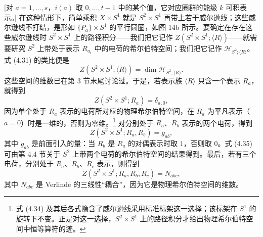 \documentclass[11pt,a4paper]{article}
\begin{document}
[对 $a=1,\dots,s$，$i(a)$ 取 $0,\dots,t-1$ 中的某个值，它对应圈群的能级 $k$ 可积表示。] 在这种情形下，简单乘积 $X\times S^1$ 就是 $S^2\times S^1$ 再带上若干威尔逊线；这些威尔逊线不打结，是形如 $\{P_a\}\times S^1$ 的平行圆圈，如图 14b 所示。要确定在存在这些威尔逊线时 $S^2\times S^1$ 上的路径积分——我们把它记作 $Z(S^2\times S^1;\langle R\rangle)$——就需要研究 $S^2$ 上带处于表示 $R_{a_i}$ 中的电荷的希尔伯特空间；我们把它记作 $\mathcal{H}_{S^2;\langle R\rangle}$。式 (4.31) 的类比便是
\begin{equation}
    Z(S^2\times S^1;\langle R\rangle) = \dim \mathcal{H}_{S^2;\langle R\rangle}. \tag{4.33}
\end{equation}
这些空间的维数已在第 3 节末尾讨论过。于是，若表示族 $\langle R\rangle$ 只含一个表示 $R_a$，就得到
\begin{equation}
    Z(S^2\times S^1;R_a) = \delta_{a,0}, \tag{4.34}
\end{equation}
因为单个处于 $R_a$ 表示的电荷所对应的物理希尔伯特空间，在 $R_a$ 为平凡表示（$a=0$）时是一维的，否则为零维。\footnote{式 (4.34) 及其后各式隐含了威尔逊线采用标准标架这一选择；该标架在 $S^1$ 的旋转下不变。正是对这一选择，$S^2\times S^1$ 上的路径积分才给出物理希尔伯特空间中恒等算符的迹。} 对分别处于 $R_a$、$R_b$ 表示的两个电荷，得到
\begin{equation}
    Z(S^2\times S^1;R_a,R_b) = g_{ab}, \tag{4.35}
\end{equation}
其中 $g_{ab}$ 是前面引入的量：当 $R_b$ 是 $R_a$ 的对偶表示时取 $1$，否则取 $0$。式 (4.35) 可由第 4.4 节关于 $S^2$ 上带两个电荷的希尔伯特空间的结果得到。最后，若有三个电荷，分别处于 $R_a$、$R_b$、$R_c$ 表示，则得到
\begin{equation}
    Z(S^2\times S^1;R_a,R_b,R_c) = N_{abc}, \tag{4.36}
\end{equation}
其中 $N_{abc}$ 是 Verlinde 的三线性“耦合”，因为它是物理希尔伯特空间的维数。
\end{document}
